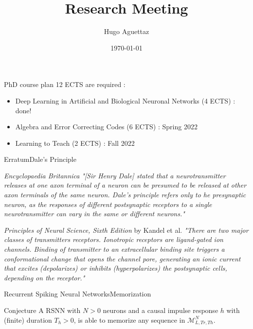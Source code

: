 \documentclass{beamer}
\title{Research Meeting}
\author{Hugo Aguettaz}
\institute{Institut für Signal- und Informationsverarbeitung\\ETH Zürich}
\date{\today}
\begin{document}
	\begin{frame}
		\titlepage
	\end{frame} 

	\begin{frame}{PhD course plan}
		12 ECTS are required :
		\begin{itemize}
			\item Deep Learning in Artificial and Biological Neuronal Networks (4 ECTS) : done!
			\item Algebra and Error Correcting Codes (6 ECTS) : Spring 2022
			\item Learning to Teach (2 ECTS) : Fall 2022
		\end{itemize}
	\end{frame} 

	\begin{frame}{Erratum}{Dale's Principle}
		\justifying
		\begin{block}{\emph{Encyclopaedia Britannica}}
			\justifying
			\emph{"[Sir Henry Dale] stated that a neurotransmitter releases at one axon terminal of a neuron can be presumed to be released at other axon terminals of the same neuron. Dale's principle refers only to he presynaptic neuron, as the responses of different postsynaptic receptors to a single neurotransmitter can vary in the same or different neurons."}
		\end{block}
		\begin{block}{\emph{Principles of Neural Science, Sixth Edition} by Kandel et al.}
			\justifying
			\emph{"There are two major classes of transmitters receptors. Ionotropic receptors are ligand-gated ion channels. Binding of transmitter to an extracellular binding site triggers a conformational change that opens the channel pore, generating an ionic current that excites (depolarizes) or inhibits (hyperpolarizes) the postsynaptic cells, depending on the receptor."}
		\end{block}
	\end{frame}

	\begin{frame}{Recurrent Spiking Neural Networks}{Memorization}
		\justifying
		\begin{block}{Conjecture}
			\justifying
			A RSNN with $N > 0$ neurons and a causal impulse response $h$ with (finite) duration $T_h > 0$, is able to memorize any sequence in $\mathcal{M}_{L, Tr, Th}^N$.
		\end{block}
	\end{frame}
\end{document}
